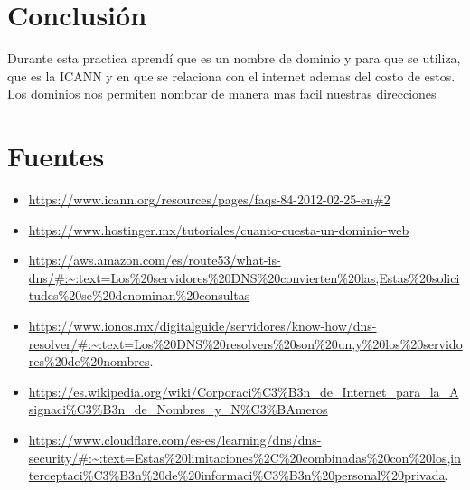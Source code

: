 \documentclass[11pt]{article}
\begin{document}
\section{Conclusión}
\label{sec:org939a19d}
Durante esta practica aprendí que es un nombre de dominio y para que
se utiliza, que es la ICANN y en que se relaciona con el internet
ademas del costo de estos. Los dominios nos permiten nombrar de manera
mas facil nuestras direcciones 

\section{Fuentes}
\label{sec:orgd53522f}
\begin{itemize}
\item \url{https://www.icann.org/resources/pages/faqs-84-2012-02-25-en\#2}
\item \url{https://www.hostinger.mx/tutoriales/cuanto-cuesta-un-dominio-web}
\item \url{https://aws.amazon.com/es/route53/what-is-dns/\#:\~:text=Los\%20servidores\%20DNS\%20convierten\%20las,Estas\%20solicitudes\%20se\%20denominan\%20consultas}
\item \url{https://www.ionos.mx/digitalguide/servidores/know-how/dns-resolver/\#:\~:text=Los\%20DNS\%20resolvers\%20son\%20un,y\%20los\%20servidores\%20de\%20nombres}.
\item \url{https://es.wikipedia.org/wiki/Corporaci\%C3\%B3n\_de\_Internet\_para\_la\_Asignaci\%C3\%B3n\_de\_Nombres\_y\_N\%C3\%BAmeros}
\item \url{https://www.cloudflare.com/es-es/learning/dns/dns-security/\#:\~:text=Estas\%20limitaciones\%2C\%20combinadas\%20con\%20los,interceptaci\%C3\%B3n\%20de\%20informaci\%C3\%B3n\%20personal\%20privada}.
\end{itemize}
\end{document}
